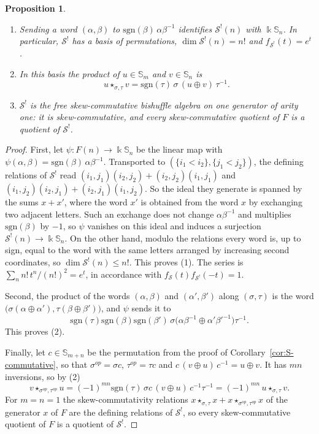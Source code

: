 \documentclass[11pt]{amsart}
\newtheorem{proposition}[theorem]{Proposition}
\theoremstyle{definition}
\theoremstyle{remark}
\newcommand{\bS}{\mathbb{S}}
\newcommand{\kk}{\Bbbk}
\newcommand{\sgn}{\mathrm{sgn}}
\newcommand{\cS}{\mathscr{S}}
\begin{document}
\begin{proposition}\label{prop:S-dual}
\begin{enumerate}
\item Sending a word $(\alpha,\beta)$ to $\sgn(\beta)\,\alpha\beta^{-1}$ identifies $\cS^!(n)$ with $\kk\bS_n$. In particular, $\cS^!$ has a basis of permutations, $\dim\cS^!(n)=n!$ and $f_{\cS^!}(t)=e^t$.
\item In this basis the product of $u\in\bS_m$ and $v\in\bS_n$ is
\[
u\star_{\sigma,\tau}v=\sgn(\tau)\,\sigma\,(u\oplus v)\,\tau^{-1}.
\]
\item $\cS^!$ is the free skew-commutative bishuffle algebra on one generator of arity one: it is skew-commutative, and every skew-commutative quotient of $F$ is a quotient of $\cS^!$.
\end{enumerate}
\end{proposition}

\begin{proof}
First, let $\psi\colon F(n)\to\kk\bS_n$ be the linear map with $\psi(\alpha,\beta)=\sgn(\beta)\,\alpha\beta^{-1}$. Transported to $(\{i_1<i_2\},\{j_1<j_2\})$, the defining relations of $\cS^!$ read $(i_1,j_1)(i_2,j_2)+(i_2,j_2)(i_1,j_1)$ and $(i_1,j_2)(i_2,j_1)+(i_2,j_1)(i_1,j_2)$. So the ideal they generate is spanned by the sums $x+x'$, where the word $x'$ is obtained from the word $x$ by exchanging two adjacent letters. Such an exchange does not change $\alpha\beta^{-1}$ and multiplies $\sgn(\beta)$ by $-1$, so $\psi$ vanishes on this ideal and induces a surjection $\cS^!(n)\to\kk\bS_n$. On the other hand, modulo the relations every word is, up to sign, equal to the word with the same letters arranged by increasing second coordinates, so $\dim\cS^!(n)\le n!$. This proves (1). The series is $\sum_nn!\,t^n/(n!)^2=e^t$, in accordance with $f_\cS(t)f_{\cS^!}(-t)=1$.

Second, the product of the words $(\alpha,\beta)$ and $(\alpha',\beta')$ along $(\sigma,\tau)$ is the word $\bigl(\sigma(\alpha\oplus\alpha'),\tau(\beta\oplus\beta')\bigr)$, and $\psi$ sends it to
\[
\sgn(\tau)\sgn(\beta)\sgn(\beta')\,\sigma\bigl(\alpha\beta^{-1}\oplus\alpha'\beta'^{-1}\bigr)\tau^{-1}.
\]
This proves (2).

Finally, let $c\in\bS_{m+n}$ be the permutation from the proof of Corollary~\ref{cor:S-commutative}, so that $\sigma^{op}=\sigma c$, $\tau^{op}=\tau c$ and $c\,(v\oplus u)\,c^{-1}=u\oplus v$. It has $mn$ inversions, so by (2)
\[
v\star_{\sigma^{op},\tau^{op}}u=(-1)^{mn}\sgn(\tau)\,\sigma c\,(v\oplus u)\,c^{-1}\tau^{-1}=(-1)^{mn}\,u\star_{\sigma,\tau}v .
\]
For $m=n=1$ the skew-commutativity relations $x\star_{\sigma,\tau}x+x\star_{\sigma^{op},\tau^{op}}x$ of the generator $x$ of $F$ are the defining relations of $\cS^!$, so every skew-commutative quotient of $F$ is a quotient of $\cS^!$.
\end{proof}
\end{document}
